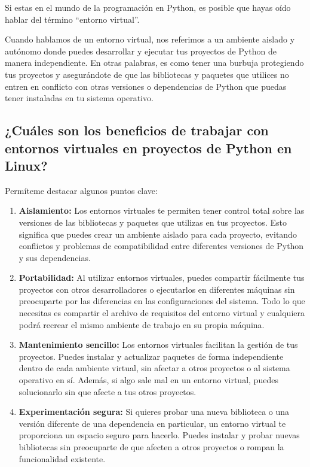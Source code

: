 \documentclass[
  letterpaper,
  DIV=11,
  numbers=noendperiod]{scrartcl}
\begin{document}
Si estas en el mundo de la programación en Python, es posible que hayas
oído hablar del término ``entorno virtual''.

Cuando hablamos de un entorno virtual, nos referimos a un ambiente
aislado y autónomo donde puedes desarrollar y ejecutar tus proyectos de
Python de manera independiente. En otras palabras, es como tener una
burbuja protegiendo tus proyectos y asegurándote de que las bibliotecas
y paquetes que utilices no entren en conflicto con otras versiones o
dependencias de Python que puedas tener instaladas en tu sistema
operativo.

\hypertarget{cuuxe1les-son-los-beneficios-de-trabajar-con-entornos-virtuales-en-proyectos-de-python-en-linux}{%
\subsection{¿Cuáles son los beneficios de trabajar con entornos
virtuales en proyectos de Python en
Linux?}\label{cuuxe1les-son-los-beneficios-de-trabajar-con-entornos-virtuales-en-proyectos-de-python-en-linux}}

Permíteme destacar algunos puntos clave:

\begin{enumerate}
\def\labelenumi{\arabic{enumi}.}
\item
  \textbf{Aislamiento:} Los entornos virtuales te permiten tener control
  total sobre las versiones de las bibliotecas y paquetes que utilizas
  en tus proyectos. Esto significa que puedes crear un ambiente aislado
  para cada proyecto, evitando conflictos y problemas de compatibilidad
  entre diferentes versiones de Python y sus dependencias.
\item
  \textbf{Portabilidad:} Al utilizar entornos virtuales, puedes
  compartir fácilmente tus proyectos con otros desarrolladores o
  ejecutarlos en diferentes máquinas sin preocuparte por las diferencias
  en las configuraciones del sistema. Todo lo que necesitas es compartir
  el archivo de requisitos del entorno virtual y cualquiera podrá
  recrear el mismo ambiente de trabajo en su propia máquina.
\item
  \textbf{Mantenimiento sencillo:} Los entornos virtuales facilitan la
  gestión de tus proyectos. Puedes instalar y actualizar paquetes de
  forma independiente dentro de cada ambiente virtual, sin afectar a
  otros proyectos o al sistema operativo en sí. Además, si algo sale mal
  en un entorno virtual, puedes solucionarlo sin que afecte a tus otros
  proyectos.
\item
  \textbf{Experimentación segura:} Si quieres probar una nueva
  biblioteca o una versión diferente de una dependencia en particular,
  un entorno virtual te proporciona un espacio seguro para hacerlo.
  Puedes instalar y probar nuevas bibliotecas sin preocuparte de que
  afecten a otros proyectos o rompan la funcionalidad existente.
\end{enumerate}
\end{document}
